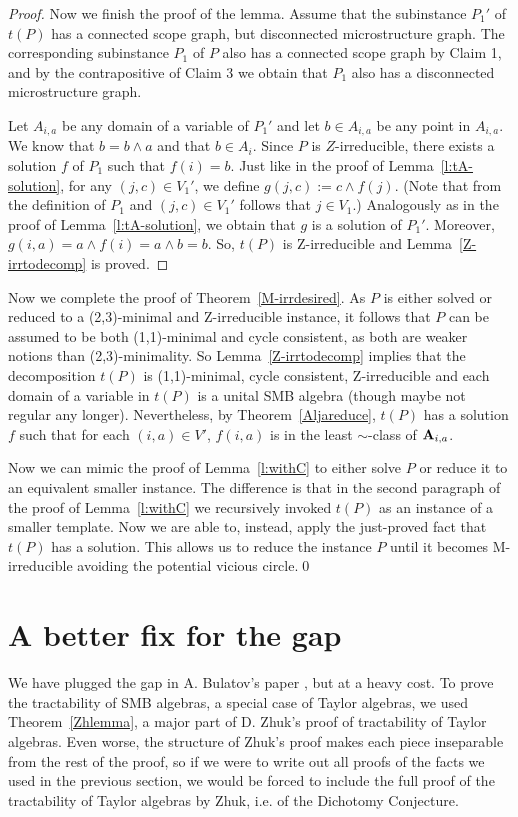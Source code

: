 \documentclass[11pt]{amsart}
\newcommand{\m}[1]{{\uppercase {\mathbf {#1}}}}
\newcommand{\mt}{\wedge}
\theoremstyle{definition}
\begin{document}
\begin{proof}
Now we finish the proof of the lemma. Assume that the subinstance $P_1'$ of $t(P)$ has a connected scope graph, but disconnected microstructure graph. The corresponding subinstance $P_1$ of $P$ also has a connected scope graph by Claim 1, and by the contrapositive of Claim 3 we obtain that $P_1$ also has a disconnected microstructure graph.

Let $A_{i,a}$ be any domain of a variable of $P_1'$ and let $b\in A_{i,a}$ be any point in $A_{i,a}$. We know that $b=b\mt a$ and that $b\in A_i$. Since $P$ is $Z$-irreducible, there exists a solution $f$ of $P_1$ such that $f(i)=b$. Just like in the proof of Lemma~\ref{l:tA-solution}, for any $(j,c)\in V_1'$, we define $g(j,c):=c\mt f(j)$. (Note that from the definition of $P_1$ and $(j,c)\in V_1'$ follows that $j\in V_1$.) Analogously as in the proof of Lemma~\ref{l:tA-solution}, we obtain that $g$ is a solution of $P_1'$. Moreover, $g(i,a)=a\mt f(i)=a\mt b=b$. So, $t(P)$ is Z-irreducible and Lemma~\ref{Z-irrtodecomp} is proved.
\end{proof}

Now we complete the proof of Theorem~\ref{M-irrdesired}. As $P$ is either solved or reduced to a (2,3)-minimal and Z-irreducible instance, it follows that $P$ can be assumed to be both (1,1)-minimal and cycle consistent, as both are weaker notions than (2,3)-minimality. So Lemma~\ref{Z-irrtodecomp} implies that the decomposition $t(P)$ is (1,1)-minimal, cycle consistent, Z-irreducible and each domain of a variable in $t(P)$ is a unital SMB algebra (though maybe not regular any longer). Nevertheless, by Theorem~\ref{Aljareduce}, $t(P)$ has a solution $f$ such that for each $(i,a)\in V'$, $f(i,a)$ is in the least $\sim$-class of $\m a_{i,a}$. 

Now we can mimic the proof of Lemma~\ref{l:withC} to either solve $P$ or reduce it to an equivalent smaller instance. The difference is that in the second paragraph of the proof of Lemma~\ref{l:withC} we recursively invoked $t(P)$ as an instance of a smaller template. Now we are able to, instead, apply the just-proved fact that $t(P)$ has a solution. This allows us to reduce the instance $P$ until it becomes M-irreducible avoiding the potential vicious circle.\qed

\section{A better fix for the gap}

We have plugged the gap in A. Bulatov's paper \cite{BuSMB}, but at a heavy cost. To prove the tractability of SMB algebras, a special case of Taylor algebras, we used Theorem~\ref{Zhlemma}, a major part of D. Zhuk's proof of tractability of Taylor algebras. Even worse, the structure of Zhuk's proof makes each piece inseparable from the rest of the proof, so if we were to write out all proofs of the facts we used in the previous section, we would be forced to include the full proof of the tractability of Taylor algebras by Zhuk, i.e. of the Dichotomy Conjecture.
\end{document}
